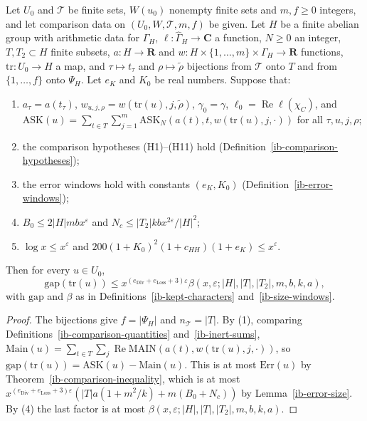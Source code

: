 \begin{lemma}\label{ib-gap-bound}
Let $U_0$ and $\mathcal T$ be finite sets, $W(u_0)$ nonempty finite sets and
$m,f\geq0$ integers, and let comparison data on $(U_0,W,\mathcal T,m,f)$ be
given. Let $H$ be a finite abelian group with arithmetic data for $\Gamma_H$,
$\ell:\widehat\Gamma_H\to\mathbf C$ a function, $N\geq0$ an integer,
$T,T_2\subset H$ finite subsets, $a:H\to\mathbf R$ and
$w:H\times\{1,\ldots,m\}\times\Gamma_H\to\mathbf R$ functions, $\mathrm{tr}:U_0\to H$
a map, and $\tau\mapsto t_\tau$ and $\rho\mapsto\tilde\rho$ bijections from
$\mathcal T$ onto $T$ and from $\{1,\ldots,f\}$ onto $\Psi_H$. Let $e_K$ and $K_0$
be real numbers. Suppose that:
\begin{enumerate}
\item $a_\tau=a(t_\tau)$, $w_{u,j,\rho}=w(\mathrm{tr}(u),j,\tilde\rho)$,
  $\gamma_0=\gamma$, $\ell_0=\operatorname{Re}\ell(\chi_C)$, and
  $\mathrm{ASK}(u)=\sum_{t\in T}\sum_{j=1}^m\mathrm{ASK}_N(a(t),t,w(\mathrm{tr}(u),j,\cdot))$
  for all $\tau,u,j,\rho$;
\item the comparison hypotheses (H1)--(H11) hold
  (Definition~\ref{ib-comparison-hypotheses});
\item the error windows hold with constants $(e_K,K_0)$
  (Definition~\ref{ib-error-windows});
\item $B_0\leq2|H|mbx^\varepsilon$ and $N_c\leq|T_2|kbx^{2\varepsilon}/|H|^2$;
\item $\log x\leq x^\varepsilon$ and
  $200(1+K_0)^2(1+c_{HH})(1+e_K)\leq x^\varepsilon$.
\end{enumerate}
Then for every $u\in U_0$,
\[
 \mathrm{gap}(\mathrm{tr}(u))\leq x^{(e_{\mathrm{Div}}+e_{\mathrm{Loss}}+3)\varepsilon}
 \beta(x,\varepsilon;|H|,|T|,|T_2|,m,b,k,a),
\]
with $\mathrm{gap}$ and $\beta$ as in Definitions~\ref{ib-kept-characters}
and~\ref{ib-size-windows}.
\end{lemma}
\begin{proof}
The bijections give $f=|\Psi_H|$ and $n_{\mathcal T}=|T|$. By (1), comparing
Definitions~\ref{ib-comparison-quantities} and~\ref{ib-inert-sums},
$\mathrm{Main}(u)=\sum_{t\in T}\sum_j\operatorname{Re}\mathrm{MAIN}(a(t),w(\mathrm{tr}(u),j,\cdot))$,
so $\mathrm{gap}(\mathrm{tr}(u))=\mathrm{ASK}(u)-\mathrm{Main}(u)$. This is at most
$\mathrm{Err}(u)$ by Theorem~\ref{ib-comparison-inequality}, which is at most
$x^{(e_{\mathrm{Div}}+e_{\mathrm{Loss}}+3)\varepsilon}(|T|a(1+m^2/k)+m(B_0+N_c))$
by Lemma~\ref{ib-error-size}. By (4) the last factor is at most
$\beta(x,\varepsilon;|H|,|T|,|T_2|,m,b,k,a)$.
\end{proof}

